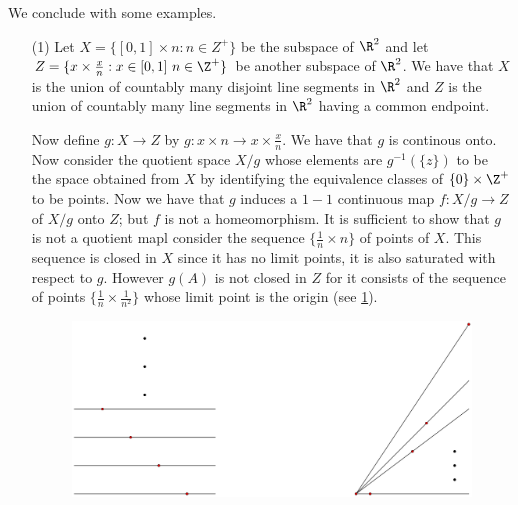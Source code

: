 We conclude with some examples.

\begin{example}
    \begin{enumerate}
        \item[(1)] Let $X=\{[0,1] \times n:n \in Z^+\}$ be the subspace of $\R^2$ and let  $Z=\{x \times
            \frac{x}{n}: x \in [0,1] \text{ } n \in \Z^+\}$ be another subspace of $\R^2$. We have
            that  $X$ is the union of countably many disjoint line segments in  $\R^2$ and  $Z$ is
            the union of countably many line segments in  $\R^2$ having a common endpoint.

            Now define $g:X \rightarrow Z$ by  $g:x \times n \rightarrow x \times \frac{x}{n}$. We
            have that $g$ is continous onto. Now consider the quotient space  $X/g$ whose elements
            are  $g^{-1}(\{z\})$ to be the space obtained from $X$ by identifying the equivalence
            classes of $\{0\} \times \Z^+$ to be points. Now we have that $g$ induces a  $1-1$
            continuous map  $f:X/g \rightarrow Z$ of  $X/g$ onto  $Z$; but  $f$ is not a
            homeomorphism. It is sufficient to show that  $g$ is not a quotient mapl consider the
            sequence  $\{\frac{1}{n} \times n\}$ of points of $X$. This sequence is closed in  $X$
            since it has no limit points, it is also saturated with respect to  $g$. However  $g(A)$
            is not closed in $Z$ for it consists of the sequence of points  $\{\frac{1}{n} \times
            \frac{1}{n^2}\}$ whose limit point is the origin (see \ref{fig_2.6}).

            \begin{figure}[h]
                \centering
                \includegraphics[scale = 0.2]{Figures/Chapter2/nonHomeomorphicPoints.eps}
                \caption{}
                \label{fig_2.6}
            \end{figure}


\end{enumerate}
\end{example}
